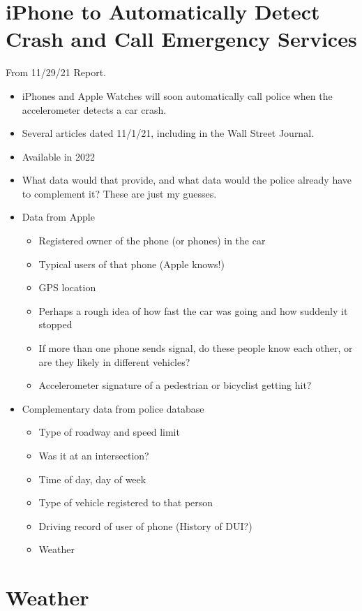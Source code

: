 \section{iPhone to Automatically Detect Crash and Call Emergency Services}

From 11/29/21 Report.

\begin{itemize}
	\item iPhones and Apple Watches will soon automatically call police when the accelerometer detects a car crash.
	\item Several articles dated 11/1/21, including in the Wall Street Journal.  
	\item Available in 2022
	\item What data would that provide, and what data would the police already have to complement it?  These are just my guesses.
	\item Data from Apple
	\begin{itemize}
		\item Registered owner of the phone (or phones) in the car
		\item Typical users of that phone (Apple knows!)
		\item GPS location
		\item Perhaps a rough idea of how fast the car was going and how suddenly it stopped
		\item If more than one phone sends signal, do these people know each other, or are they likely in different vehicles?
		\item Accelerometer signature of a pedestrian or bicyclist getting hit?
	\end{itemize}
	\item Complementary data from police database
	\begin{itemize}
		\item Type of roadway and speed limit
		\item Was it at an intersection?
		\item Time of day, day of week
		\item Type of vehicle registered to that person
		\item Driving record of user of phone (History of DUI?)
		\item Weather
	\end{itemize}
\end{itemize}

\section{Weather}

